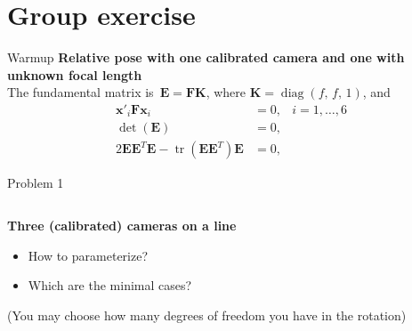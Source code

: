 \documentclass[aspectratio=169]{beamer}
\newcommand{\mat}[1]{\bm{#1}}
\DeclareMathOperator{\tr}{tr}
\DeclareMathOperator{\diag}{diag}
\newcommand{\T}{T}
\begin{document}
\section{Group exercise}

\begin{frame}{Warmup}
\textbf{Relative pose with one calibrated camera and one with unknown focal length}\\[8mm]
The fundamental matrix is~$\mat{E=FK}$, where $\mat{K}=\diag(f,\,f,\,1)$, and
\begin{equation*}
\begin{aligned}
    \mat{x}'_i\mat{F}\mat{x}_i &= 0, &i=1,\ldots,6\\
    \det(\mat{E}) &= 0, &\\
    2\mat{EE}^\T\mat{E}- \tr(\mat{EE}^\T)\mat{E} &= 0, &
\end{aligned}
\end{equation*}
\end{frame}

\begin{frame}{Problem 1}
\begin{columns}
    \begin{column}{0.5\textwidth}
        \textbf{Three (calibrated) cameras on a line}\\[8mm]
        \begin{itemize}
            \item How to parameterize?
            \item Which are the minimal cases?
        \end{itemize}
    \vspace{8mm}
    \footnotesize{(You may choose how many degrees of freedom you have in the rotation)}
    \end{column}%
    \begin{column}{0.5\textwidth}
        \centering
        
    \end{column}
\end{columns}
\end{frame}
\end{document}
